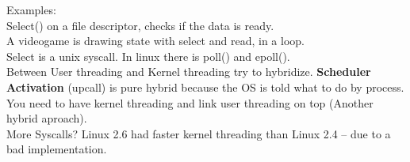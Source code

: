 \documentclass[../base_file/cs1550_notes.tex]{subfiles}
\begin{document}
Examples:\\
Select() on a file descriptor, checks if the data is ready.\\
A videogame is drawing state with select and read, in a loop.\\

Select is a unix syscall. In linux there is poll() and epoll().\\
Between User threading and Kernel threading try to hybridize.  \textbf{Scheduler Activation}
(upcall) is pure hybrid because the OS is told what to do by process.\\

You need to have kernel threading and link user threading on top (Another hybrid aproach).\\
More Syscalls? Linux 2.6 had faster kernel threading than Linux 2.4 -- due to a bad
implementation.
\end{document}
